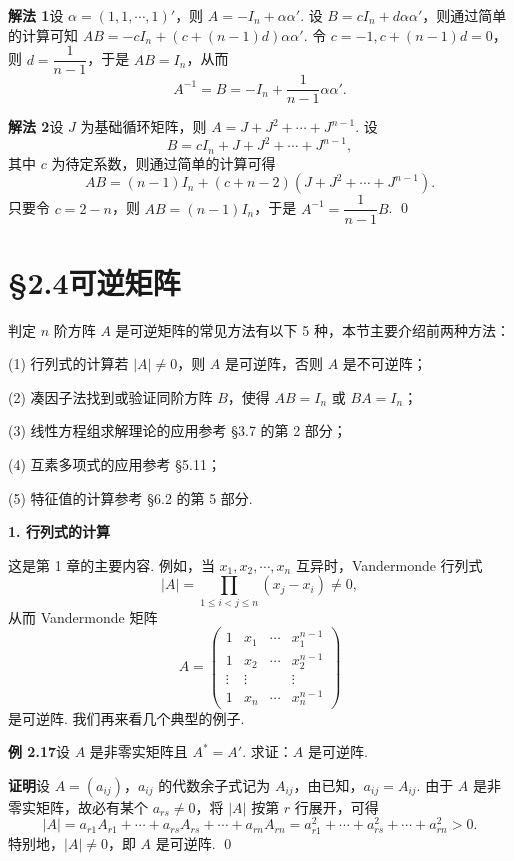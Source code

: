 \documentclass[UTF8, 12pt, fontset=fandol, oneside]{ctexart}
\begin{document}
\noindent\textbf{解法 1}\quad 设 $\alpha=(1,1,\cdots,1)'$，则 $A=-I_n+\alpha\alpha'$. 设 $B=cI_n+d\alpha\alpha'$，则通过简单的计算可知 $AB=-cI_n+(c+(n-1)d)\alpha\alpha'$. 令 $c=-1,c+(n-1)d=0$，则 $d=\dfrac1{n-1}$，于是 $AB=I_n$，从而
\[
A^{-1}=B=-I_n+\frac1{n-1}\alpha\alpha'.
\]

\noindent\textbf{解法 2}\quad 设 $J$ 为基础循环矩阵，则 $A=J+J^2+\cdots+J^{n-1}$. 设
\[
B=cI_n+J+J^2+\cdots+J^{n-1},
\]
其中 $c$ 为待定系数，则通过简单的计算可得
\[
AB=(n-1)I_n+(c+n-2)(J+J^2+\cdots+J^{n-1}).
\]
只要令 $c=2-n$，则 $AB=(n-1)I_n$，于是 $A^{-1}=\dfrac1{n-1}B$. \qed

\section*{§2.4\quad 可逆矩阵}

判定 $n$ 阶方阵 $A$ 是可逆矩阵的常见方法有以下 5 种，本节主要介绍前两种方法：

(1) 行列式的计算\quad 若 $|A|\ne0$，则 $A$ 是可逆阵，否则 $A$ 是不可逆阵；

(2) 凑因子法\quad 找到或验证同阶方阵 $B$，使得 $AB=I_n$ 或 $BA=I_n$；

(3) 线性方程组求解理论的应用\quad 参考 §3.7 的第 2 部分；

(4) 互素多项式的应用\quad 参考 §5.11；

(5) 特征值的计算\quad 参考 §6.2 的第 5 部分.

\noindent\textbf{1. 行列式的计算}

这是第 1 章的主要内容. 例如，当 $x_1,x_2,\cdots,x_n$ 互异时，Vandermonde 行列式
\[
|A|=\prod_{1\le i<j\le n}(x_j-x_i)\ne0,
\]
从而 Vandermonde 矩阵
\[
A=
\left(
\begin{array}{cccc}
1 & x_1 & \cdots & x_1^{n-1}\\
1 & x_2 & \cdots & x_2^{n-1}\\
\vdots & \vdots & & \vdots\\
1 & x_n & \cdots & x_n^{n-1}
\end{array}
\right)
\]
是可逆阵. 我们再来看几个典型的例子.

\noindent\textbf{例 2.17}\quad 设 $A$ 是非零实矩阵且 $A^*=A'$. 求证：$A$ 是可逆阵.

\noindent\textbf{证明}\quad 设 $A=(a_{ij})$，$a_{ij}$ 的代数余子式记为 $A_{ij}$，由已知，$a_{ij}=A_{ij}$. 由于 $A$ 是非零实矩阵，故必有某个 $a_{rs}\ne0$，将 $|A|$ 按第 $r$ 行展开，可得
\[
|A|=a_{r1}A_{r1}+\cdots+a_{rs}A_{rs}+\cdots+a_{rn}A_{rn}
=a_{r1}^2+\cdots+a_{rs}^2+\cdots+a_{rn}^2>0.
\]
特别地，$|A|\ne0$，即 $A$ 是可逆阵. \qed
\end{document}
